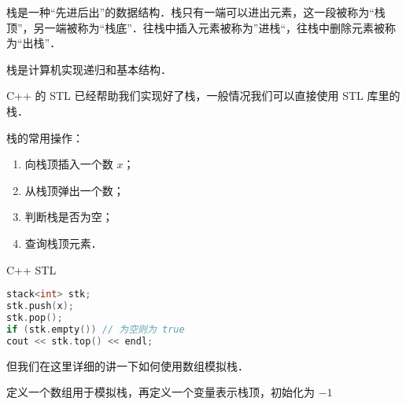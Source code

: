 
栈是一种“先进后出”的数据结构．栈只有一端可以进出元素，这一段被称为“栈顶”，另一端被称为“栈底”．往栈中插入元素被称为”进栈“，往栈中删除元素被称为“出栈”．

栈是计算机实现递归和基本结构．

C++ 的 STL 已经帮助我们实现好了栈，一般情况我们可以直接使用 STL 库里的栈．

栈的常用操作：
\begin{enumerate}
\item 向栈顶插入一个数 $x$；
\item 从栈顶弹出一个数；
\item 判断栈是否为空；
\item 查询栈顶元素．
\end{enumerate}

C++ STL
\begin{lstlisting}[language=cpp]
stack<int> stk;
stk.push(x);
stk.pop();
if (stk.empty()) // 为空则为 true
cout << stk.top() << endl;
\end{lstlisting}

但我们在这里详细的讲一下如何使用数组模拟栈．

定义一个数组用于模拟栈，再定义一个变量表示栈顶，初始化为 $-1$
